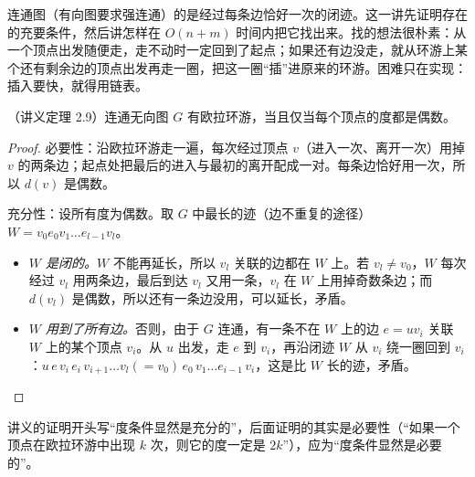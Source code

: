\label{lec:euler-tours}

连通图（有向图要求强连通）的是经过每条边恰好一次的闭迹。这一讲先证明存在的充要条件，然后讲怎样在 $O(n+m)$ 时间内把它找出来。找的想法很朴素：从一个顶点出发随便走，走不动时一定回到了起点；如果还有边没走，就从环游上某个还有剩余边的顶点出发再走一圈，把这一圈“插”进原来的环游。困难只在实现：插入要快，就得用链表。


\begin{theorem}\label{thm:euler-tours:undirected}
（讲义定理 2.9）连通无向图 $G$ 有欧拉环游，当且仅当每个顶点的度都是偶数。
\end{theorem}
\begin{proof}
必要性：沿欧拉环游走一遍，每次经过顶点 $v$（进入一次、离开一次）用掉 $v$ 的两条边；起点处把最后的进入与最初的离开配成一对。每条边恰好用一次，所以 $d(v)$ 是偶数。

充分性：设所有度为偶数。取 $G$ 中最长的迹（边不重复的途径）$W=v_0e_0v_1\dots e_{l-1}v_l$。
\begin{itemize}
\item \emph{$W$ 是闭的。}$W$ 不能再延长，所以 $v_l$ 关联的边都在 $W$ 上。若 $v_l\neq v_0$，$W$ 每次经过 $v_l$ 用两条边，最后到达 $v_l$ 又用一条，$v_l$ 在 $W$ 上用掉奇数条边；而 $d(v_l)$ 是偶数，所以还有一条边没用，可以延长，矛盾。
\item \emph{$W$ 用到了所有边。}否则，由于 $G$ 连通，有一条不在 $W$ 上的边 $e=uv_i$ 关联 $W$ 上的某个顶点 $v_i$。从 $u$ 出发，走 $e$ 到 $v_i$，再沿闭迹 $W$ 从 $v_i$ 绕一圈回到 $v_i$：$u\,e\,v_i\,e_i\,v_{i+1}\dots v_l(=v_0)\,e_0\,v_1\dots e_{i-1}\,v_i$，这是比 $W$ 长的迹，矛盾。\qedhere
\end{itemize}
\end{proof}

\begin{remark}[讲义的笔误]
讲义的证明开头写“度条件显然是充分的”，后面证明的其实是必要性（“如果一个顶点在欧拉环游中出现 $k$ 次，则它的度一定是 $2k$”），应为“度条件显然是必要的”。
\end{remark}

